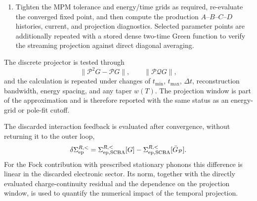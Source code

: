 \documentclass[
 reprint,
 superscriptaddress,
 amsmath,amssymb,
 aps,prb,
 longbibliography,
 floatfix
]{revtex4-2}
\newcommand{\ep}{\mathrm{ep}}
\newcommand{\proj}{\mathcal P}
\newcommand{\qproj}{\mathcal Q}
\begin{document}
\begin{enumerate}
\item Tighten the MPM tolerance and energy/time grids as required, re-evaluate the converged fixed point, and then compute the production \(A\)--\(B\)--\(C\)--\(D\) histories, current, and projection diagnostics. Selected parameter points are additionally repeated with a stored dense two-time Green function to verify the streaming projection against direct diagonal averaging.
\end{enumerate}

The discrete projector is tested through
\begin{equation}
\|\proj^2G-\proj G\|,
\qquad
\|\proj\qproj G\|,
\label{eq:projection-diagnostics}
\end{equation}
and the calculation is repeated under changes of \(t_{\min}\), \(t_{\max}\), \(\Delta t\), reconstruction bandwidth, energy spacing, and any taper \(w(T)\). The projection window is part of the approximation and is therefore reported with the same status as an energy-grid or pole-fit cutoff.

The discarded interaction feedback is evaluated after convergence, without returning it to the outer loop,
\begin{equation*}
\delta\Sigma_{\ep}^{R,<}
=
\Sigma_{\ep,\rm SCBA}^{R,<}[G]
-
\Sigma_{\ep,\rm SCBA}^{R,<}[\bar G_{\mathcal P}].
\end{equation*}
For the Fock contribution with prescribed stationary phonons this difference is linear in the discarded electronic sector. Its norm, together with the directly evaluated charge-continuity residual and the dependence on the projection window, is used to quantify the numerical impact of the temporal projection.
\end{document}
